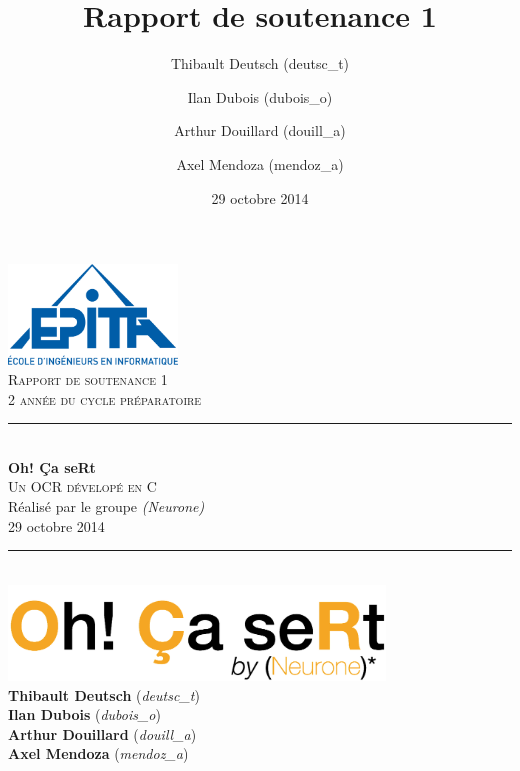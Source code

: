 \documentclass[11pt]{report}
\title{Rapport de soutenance 1}
\author{Thibault Deutsch (deutsc\_t) \and Ilan Dubois (dubois\_o) \and Arthur Douillard (douill\_a) \and Axel Mendoza (mendoz\_a)}
\date{29 octobre 2014}
\begin{document}
\renewcommand{\labelitemi}{$\bullet$}

\begin{titlepage}
\newcommand{\HRule}{\rule{\linewidth}{0.5mm}} %

\flushright
\includegraphics[width = 4.5cm]{epita.png}\\[0.5cm] %

\textsc{\Large Rapport de soutenance 1}\\[0.15cm] %
\textsc{\large 2 année du cycle préparatoire}\\[3cm] %

\center
\HRule \\[0.5cm]
{\Huge \bfseries Oh! Ça seRt}\\[0.3cm] %
\textsc{\Large Un OCR dévelopé en C}\\[0.1cm]
\large Réalisé par le groupe \emph{(Neurone)\up{*}}\\[1.5cm]
\large 29 octobre 2014\\[0.1cm]
\HRule \\[2cm]

\includegraphics[width = 10cm]{logo.png}\\[1cm]

\Large
\textbf{Thibault Deutsch} (\emph{deutsc\_t}) \\
\textbf{Ilan Dubois} (\emph{dubois\_o}) \\
\textbf{Arthur Douillard} (\emph{douill\_a}) \\
\textbf{Axel Mendoza} (\emph{mendoz\_a})\\[2cm]

\vfill %

\end{titlepage}
\end{document}
